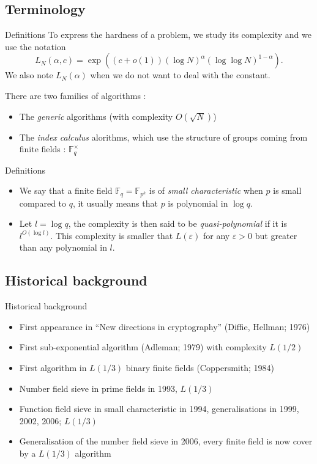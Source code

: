 \documentclass[xcolor=x11names,compress]{beamer}
\theoremstyle{break}
\theoremstyle{sc}
\theoremstyle{definition}
\theoremstyle{remark}
\begin{document}
\subsection{Terminology}
\begin{frame}{Definitions}
  To express the hardness of a problem, we study its complexity and we use the
  notation
  \[
    L_N(\alpha, c) = \exp((c+o(1))(\log N)^\alpha(\log\log N)^{1-\alpha}).
  \]
  We also note $L_N(\alpha)$ when we do not want to deal with the constant.

  There are two families of algorithms :
  \begin{itemize}
    \item The \emph{generic} algorithms (with complexity $O(\sqrt N)$)
    \item The \emph{index calculus} alorithms, which use the structure
      of groups coming from finite fields : $\mathbb{F}_{q}^\times$
  \end{itemize}
\end{frame}

\begin{frame}{Definitions}
  \begin{itemize}
    \item We say that a finite field $\mathbb{F}_q=\mathbb{F}_{p^k}$ is of
      \emph{small characteristic} when $p$ is small compared to $q$, it usually
      means that $p$ is polynomial in $\log q$.
    \item Let $l = \log q$, the complexity is then said to be
      \emph{quasi-polynomial} if it is
  $l^{O(\log l)}$. This complexity is smaller that $L(\varepsilon)$ for any
  $\varepsilon>0$ but greater than any polynomial in $l$.
  \end{itemize}
\end{frame}

\subsection{Historical background}
\begin{frame}{Historical background}
  \begin{itemize}
    \item First appearance in ``New directions in cryptography'' (Diffie, Hellman; 1976)
    \item First sub-exponential algorithm (Adleman; 1979) with complexity
      $L(1/2)$
  \item First algorithm in $L(1/3)$ binary finite fields
    (Coppersmith; 1984)
  \item Number field sieve in prime fields in 1993,
    $L(1/3)$
  \item Function field sieve in small characteristic in 1994,
    generalisations in 1999, 2002, 2006; $L(1/3)$
  \item Generalisation of the number field sieve in 2006, every finite
    field is now cover by a $L(1/3)$ algorithm
  \end{itemize}
\end{frame}
\end{document}
